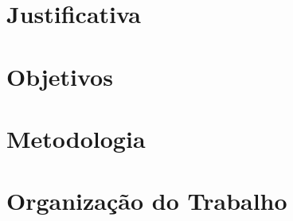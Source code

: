 \section{Justificativa}


\section{Objetivos}


\section{Metodologia}


\section{Organização do Trabalho}


%
%
%
%
%
%
%
